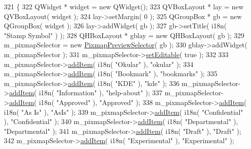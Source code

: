 \begin{DoxyCode}
321 \{
322     QWidget * widget = \textcolor{keyword}{new} QWidget();
323     QVBoxLayout * lay = \textcolor{keyword}{new} QVBoxLayout( widget );
324     lay->setMargin( 0 );
325     QGroupBox * gb = \textcolor{keyword}{new} QGroupBox( widget );
326     lay->addWidget( gb );
327     gb->setTitle( i18n( \textcolor{stringliteral}{"Stamp Symbol"} ) );
328     QHBoxLayout * gblay = \textcolor{keyword}{new} QHBoxLayout( gb );
329     m\_pixmapSelector = \textcolor{keyword}{new} \hyperlink{classPixmapPreviewSelector}{PixmapPreviewSelector}( gb );
330     gblay->addWidget( m\_pixmapSelector );
331     m\_pixmapSelector->\hyperlink{classPixmapPreviewSelector_a0adf1797472299f46c16f4ba881a1cc3}{setEditable}( \textcolor{keyword}{true} );
332 
333     m\_pixmapSelector->\hyperlink{classPixmapPreviewSelector_ac4729c46cc585aba462dd2eebcb74a92}{addItem}( i18n( \textcolor{stringliteral}{"Okular"} ), \textcolor{stringliteral}{"okular"} );
334     m\_pixmapSelector->\hyperlink{classPixmapPreviewSelector_ac4729c46cc585aba462dd2eebcb74a92}{addItem}( i18n( \textcolor{stringliteral}{"Bookmark"} ), \textcolor{stringliteral}{"bookmarks"} );
335     m\_pixmapSelector->\hyperlink{classPixmapPreviewSelector_ac4729c46cc585aba462dd2eebcb74a92}{addItem}( i18n( \textcolor{stringliteral}{"KDE"} ), \textcolor{stringliteral}{"kde"} );
336     m\_pixmapSelector->\hyperlink{classPixmapPreviewSelector_ac4729c46cc585aba462dd2eebcb74a92}{addItem}( i18n( \textcolor{stringliteral}{"Information"} ), \textcolor{stringliteral}{"help-about"} );
337     m\_pixmapSelector->\hyperlink{classPixmapPreviewSelector_ac4729c46cc585aba462dd2eebcb74a92}{addItem}( i18n( \textcolor{stringliteral}{"Approved"} ), \textcolor{stringliteral}{"Approved"} );
338     m\_pixmapSelector->\hyperlink{classPixmapPreviewSelector_ac4729c46cc585aba462dd2eebcb74a92}{addItem}( i18n( \textcolor{stringliteral}{"As Is"} ), \textcolor{stringliteral}{"AsIs"} );
339     m\_pixmapSelector->\hyperlink{classPixmapPreviewSelector_ac4729c46cc585aba462dd2eebcb74a92}{addItem}( i18n( \textcolor{stringliteral}{"Confidential"} ), \textcolor{stringliteral}{"Confidential"} );
340     m\_pixmapSelector->\hyperlink{classPixmapPreviewSelector_ac4729c46cc585aba462dd2eebcb74a92}{addItem}( i18n( \textcolor{stringliteral}{"Departmental"} ), \textcolor{stringliteral}{"Departmental"} );
341     m\_pixmapSelector->\hyperlink{classPixmapPreviewSelector_ac4729c46cc585aba462dd2eebcb74a92}{addItem}( i18n( \textcolor{stringliteral}{"Draft"} ), \textcolor{stringliteral}{"Draft"} );
342     m\_pixmapSelector->\hyperlink{classPixmapPreviewSelector_ac4729c46cc585aba462dd2eebcb74a92}{addItem}( i18n( \textcolor{stringliteral}{"Experimental"} ), \textcolor{stringliteral}{"Experimental"} );

\end{DoxyCode}
